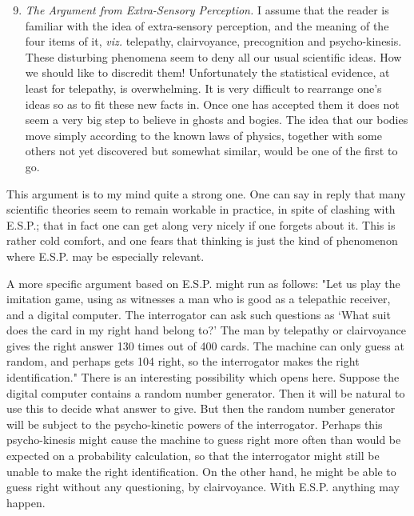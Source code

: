 \documentclass[12pt]{article}
\begin{document}
    \begin{enumerate}[label=(\arabic*)]
        \setcounter{enumi}{8}
        \item{\textit{The Argument from Extra-Sensory Perception.} I assume that the reader is familiar with the idea of extra-sensory perception, and the meaning of the four items of it, \textit{viz.} telepathy, clairvoyance, precognition and psycho-kinesis. These disturbing phenomena seem to deny all our usual scientific ideas. How we should like to discredit them! Unfortunately the statistical evidence, at least for telepathy, is overwhelming. It is very difficult to rearrange one's ideas so as to fit these new facts in. Once one has accepted them it does not seem a very big step to believe in ghosts and bogies. The idea that our bodies move simply according to the known laws of physics, together with some others not yet discovered but somewhat similar, would be one of the first to go.}
    \end{enumerate}

    This argument is to my mind quite a strong one. One can say in reply that many scientific theories seem to remain workable in practice, in spite of clashing with E.S.P.; that in fact one can get along very nicely if one forgets about it. This is rather cold comfort, and one fears that thinking is just the kind of phenomenon where E.S.P. may be especially relevant.
    
    A more specific argument based on E.S.P. might run as follows: "Let us play the imitation game, using as witnesses a man who is good as a telepathic receiver, and a digital computer. The interrogator can ask such questions as ‘What suit does the card in my right hand belong to?' The man by telepathy or clairvoyance gives the right answer 130 times out of 400 cards. The machine can only guess at random, and perhaps gets 104 right, so the interrogator makes the right identification." There is an interesting possibility which opens here. Suppose the digital computer contains a random number generator. Then it will be natural to use this to decide what answer to give. But then the random number generator will be subject to the psycho-kinetic powers of the interrogator. Perhaps this psycho-kinesis might cause the machine to guess right more often than would be expected on a probability calculation, so that the interrogator might still be unable to make the right identification. On the other hand, he might be able to guess right without any questioning, by clairvoyance. With E.S.P. anything may happen.
\end{document}
